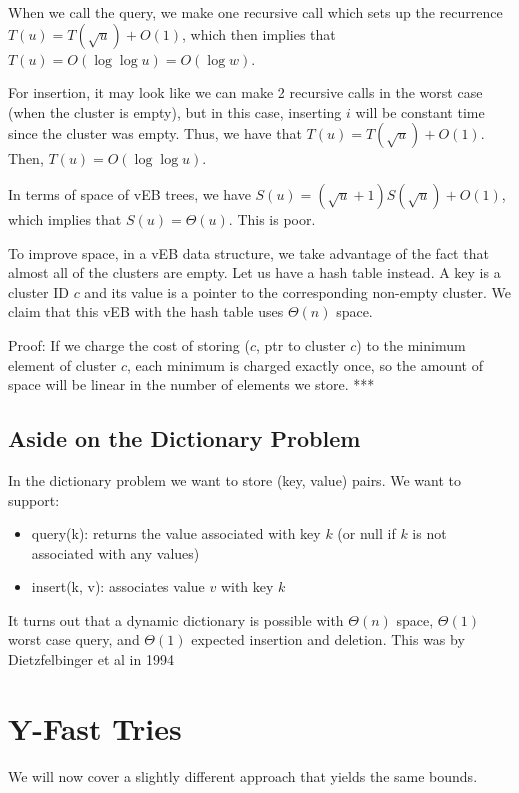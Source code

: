 \documentclass[11pt]{article}
\begin{document}
When we call the query, we make one recursive call which sets up the recurrence $T(u) = T(\sqrt{u}) + O(1)$, which then implies that $T(u) = O(\log{\log{u}}) = O(\log{w})$.

For insertion, it may look like we can make 2 recursive calls in the worst case (when the cluster is empty), but in this case, inserting $i$ will be constant time since the cluster was empty. Thus, we have that $T(u) = T(\sqrt{u}) + O(1)$. Then, $T(u) = O(\log{\log{u}})$.

In terms of space of vEB trees, we have $S(u) = (\sqrt{u} + 1) S(\sqrt{u}) + O(1)$, which implies that $S(u) = \Theta(u)$. This is poor.

To improve space, in a vEB data structure, we take advantage of the fact that almost all of the clusters are empty. Let us have a hash table instead. A key is a cluster ID $c$ and its value is a pointer to the corresponding non-empty cluster. We claim that this vEB with the hash table uses $\Theta(n)$ space. 

Proof: If we charge the cost of storing ($c$, ptr to cluster $c$) to the minimum element of cluster $c$, each minimum is charged exactly once, so the amount of space will be linear in the number of elements we store. ***

\subsection{Aside on the Dictionary Problem}

In the dictionary problem we want to store (key, value) pairs. We want to support:
\begin{itemize}
\item query(k): returns the value associated with key $k$ (or null if $k$ is not associated with any values)
\item insert(k, v): associates value $v$ with key $k$
\end{itemize}

It turns out that a dynamic dictionary is possible with $\Theta(n)$ space, $\Theta(1)$ worst case query, and $\Theta(1)$ expected insertion and deletion. This was  by Dietzfelbinger et al in 1994 \cite{Dietzfelbinger94}

\section{Y-Fast Tries}
We will now cover a slightly different approach that yields the same bounds. 
\end{document}
